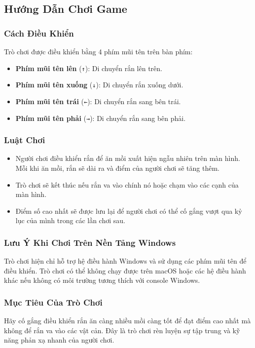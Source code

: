 \documentclass[a4paper,12pt]{article}
\begin{document}
\subsection{Hướng Dẫn Chơi Game}

\subsubsection*{Cách Điều Khiển}
Trò chơi được điều khiển bằng 4 phím mũi tên trên bàn phím:
\begin{itemize}
    \item \textbf{Phím mũi tên lên} (\texttt{↑}): Di chuyển rắn lên trên.
    \item \textbf{Phím mũi tên xuống} (\texttt{↓}): Di chuyển rắn xuống dưới.
    \item \textbf{Phím mũi tên trái} (\texttt{←}): Di chuyển rắn sang bên trái.
    \item \textbf{Phím mũi tên phải} (\texttt{→}): Di chuyển rắn sang bên phải.
\end{itemize}

\subsubsection*{Luật Chơi}
\begin{itemize}
    \item Người chơi điều khiển rắn để ăn mồi xuất hiện ngẫu nhiên trên màn hình. Mỗi khi ăn mồi, rắn sẽ dài ra và điểm của người chơi sẽ tăng thêm.
    \item Trò chơi sẽ kết thúc nếu rắn va vào chính nó hoặc chạm vào các cạnh của màn hình.
    \item Điểm số cao nhất sẽ được lưu lại để người chơi có thể cố gắng vượt qua kỷ lục của mình trong các lần chơi sau.
\end{itemize}

\subsubsection*{Lưu Ý Khi Chơi Trên Nền Tảng Windows}
Trò chơi hiện chỉ hỗ trợ hệ điều hành Windows và sử dụng các phím mũi tên để điều khiển. Trò chơi có thể không chạy được trên macOS hoặc các hệ điều hành khác nếu không có môi trường tương thích với console Windows.

\subsubsection*{Mục Tiêu Của Trò Chơi}
Hãy cố gắng điều khiển rắn ăn càng nhiều mồi càng tốt để đạt điểm cao nhất mà không để rắn va vào các vật cản. Đây là trò chơi rèn luyện sự tập trung và kỹ năng phản xạ nhanh của người chơi.
\end{document}
